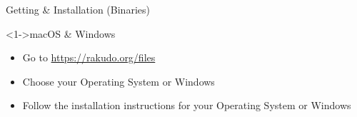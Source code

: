 \begin{frame}[fragile]{Getting \& Installation (Binaries)}
\begin{block}<1->{macOS \& Windows}
\begin{itemize}
\item<1-> Go to \url{https://rakudo.org/files}
\item<2-> Choose your Operating System or Windows
\item<3-> Follow the installation instructions for your Operating System or Windows
\end{itemize}
\end{block}
\end{frame}

%
%
